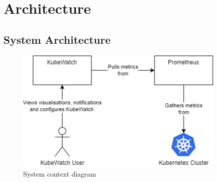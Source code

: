 \chapter{Architecture}

    

\section{System Architecture}
\begin{figure}[h!]
  \centering
  \caption{\label{fig:system-context-diagram}System context diagram}
  \includegraphics[height=6cm]{resources/System_context_diagram.png} \newline
\end{figure}

